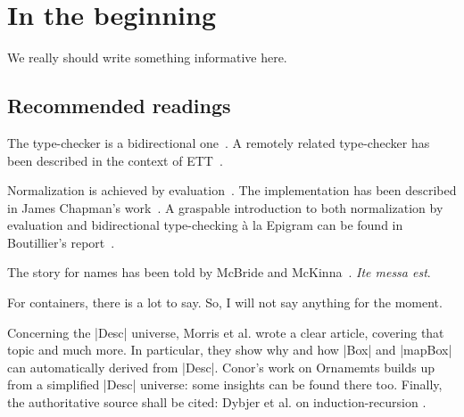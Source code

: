 \section{In the beginning}

We really should write something informative here.

\subsection{Recommended readings}

The type-checker is a bidirectional
one~\cite{turner:bidirectional_tc}. A remotely related type-checker
has been described in the context of ETT~\cite{chapman:ett}.

Normalization is achieved by evaluation~\cite{dybjer:nbe,
  dybjer:dependent_types_work}. The implementation has been described
in James Chapman's work~\cite{chapman:phd}. A graspable introduction
to both normalization by evaluation and bidirectional type-checking
\`a la Epigram can be found in Boutillier's
report~\cite{boutillier:report}.

The story for names has been told by McBride and
McKinna~\cite{mcbride:free_variable}. \emph{Ite messa est}.

For containers, there is a lot to say. So, I will not say anything for
the moment.

Concerning the |Desc| universe, Morris et al. \cite{morris:spf} wrote
a clear article, covering that topic and much more. In particular,
they show why and how |Box| and |mapBox| can automatically derived
from |Desc|. Conor's work on Ornamemts \cite{mcbride:ornaments} builds
up from a simplified |Desc| universe: some insights can be found there
too. Finally, the authoritative source shall be cited: Dybjer et
al. on induction-recursion \cite{dybjer:ir_axiom, dybjer:ir_algebra,
  dybjer:iir}.
